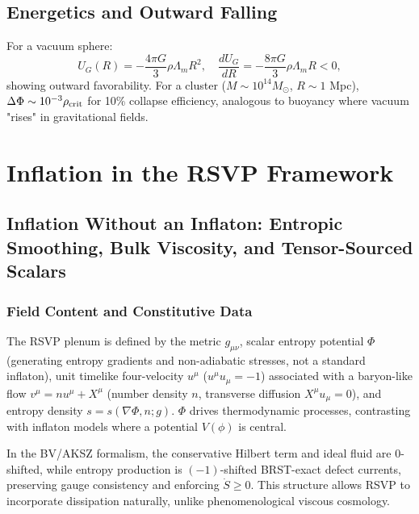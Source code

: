 \documentclass[12pt, a4paper, openany]{book}
\theoremstyle{definition}
\begin{document}
\section{Energetics and Outward Falling}
For a vacuum sphere:
\begin{equation}
U_G(R) = -\frac{4\pi G}{3} \rho \Lambda_m R^2, \quad \frac{dU_G}{dR} = -\frac{8\pi G}{3} \rho \Lambda_m R < 0,
\end{equation}
showing outward favorability. For a cluster ($M \sim 10^{14} M_\odot$, $R \sim 1$ Mpc), $\Delta \Phi \sim 10^{-3} \rho_{\rm crit}$ for 10\% collapse efficiency, analogous to buoyancy where vacuum "rises" in gravitational fields.

\chapter{Inflation in the RSVP Framework}
\section{Inflation Without an Inflaton: Entropic Smoothing, Bulk Viscosity, and Tensor-Sourced Scalars}
\label{sec:rsvp-no-inflaton}

\subsection{Field Content and Constitutive Data}
The RSVP plenum is defined by the metric $g_{\mu\nu}$, scalar entropy potential $\Phi$ (generating entropy gradients and non-adiabatic stresses, not a standard inflaton), unit timelike four-velocity $u^\mu$ ($u^\mu u_\mu = -1$) associated with a baryon-like flow $v^\mu = n u^\mu + X^\mu$ (number density $n$, transverse diffusion $X^\mu u_\mu = 0$), and entropy density $s = s(\nabla \Phi, n; g)$. $\Phi$ drives thermodynamic processes, contrasting with inflaton models where a potential $V(\phi)$ is central.

In the BV/AKSZ formalism, the conservative Hilbert term and ideal fluid are 0-shifted, while entropy production is $(-1)$-shifted BRST-exact defect currents, preserving gauge consistency and enforcing $\dot{S} \ge 0$. This structure allows RSVP to incorporate dissipation naturally, unlike phenomenological viscous cosmology.
\end{document}
